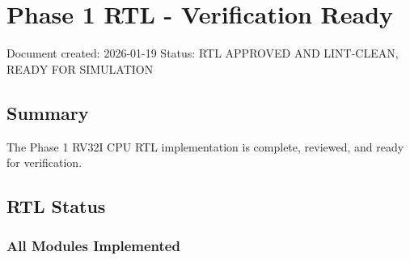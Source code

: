 \section{Phase 1 RTL - Verification Ready}\label{cr:fix:cpu-verification-ready}

\begin{record}

Document created: 2026-01-19 Status: \ok{} RTL APPROVED AND LINT-CLEAN,
READY FOR SIMULATION

\end{record}

\subsection{Summary}\label{cr:fix:cpu-verification-ready:summary}

\begin{record}

The Phase 1 RV32I CPU RTL implementation is complete, reviewed, and
ready for verification.

\end{record}

\subsection{RTL Status}\label{cr:fix:cpu-verification-ready:rtl-status}

\subsubsection{\texorpdfstring{All Modules Implemented
\ok{}}{All Modules Implemented }}\label{cr:fix:cpu-verification-ready:all-modules-implemented-white-check-mark}


